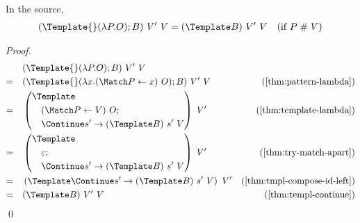 \begin{lemma}
  \label{thm:template-apart}
  In the source,
  \begin{align}
    (\Template{} (\lambda P. O); B) ~ V' ~ V
    &=
    (\Template B) ~ V' ~ V
    &(\text{if } P \apart V)
  \end{align}
\end{lemma}
\begin{proof}
  \begin{align*}
    &\quad
    (\Template{} (\lambda P. O); B) ~ V' ~ V
    \\
    =&\quad
    (\Template{} (\lambda x. (\Match P \gets x) ~ O); B) ~ V' ~ V
    &(\cref{thm:pattern-lambda})
    \\
    =&\quad
    \left(
      \begin{aligned}
        &\Template \\
        &\quad (\Match P \gets V) ~ O; \\
        &\quad \Continue s' \to (\Template B) ~ s' ~ V
      \end{aligned}
    \right)
    ~ V'
    &(\cref{thm:template-lambda})
    \\
    =&\quad
    \left(
      \begin{aligned}
        &\Template \\
        &\quad \varepsilon; \\
        &\quad \Continue s' \to (\Template B) ~ s' ~ V
      \end{aligned}
    \right)
    ~ V'
    &(\cref{thm:try-match-apart})
    \\
    =&\quad
    \left(
      \Template
      \Continue s' \to (\Template B) ~ s' ~ V
    \right)
    ~ V'
    &(\cref{thm:tmpl-compose-id-left})
    \\
    =&\quad
    (\Template B) ~ V' ~ V
    &(\cref{thm:templ-continue})
  \end{align*}
  \qed
\end{proof}



